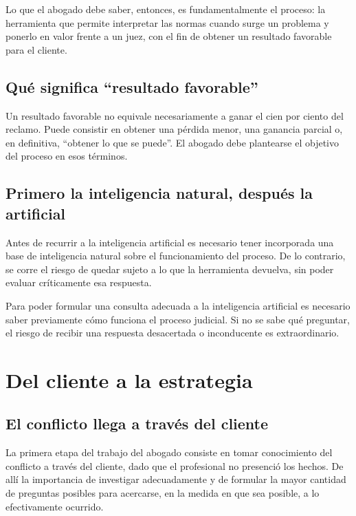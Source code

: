\documentclass[12pt,oneside]{book}
\begin{document}
Lo que el abogado debe saber, entonces, es fundamentalmente el proceso: la herramienta que permite interpretar las normas cuando surge un problema y ponerlo en valor frente a un juez, con el fin de obtener un resultado favorable para el cliente.

\subsection{Qué significa ``resultado favorable''}

\begin{important}
Un resultado favorable no equivale necesariamente a ganar el cien por ciento del reclamo. Puede consistir en obtener una pérdida menor, una ganancia parcial o, en definitiva, ``obtener lo que se puede''. El abogado debe plantearse el objetivo del proceso en esos términos.
\end{important}

\subsection{Primero la inteligencia natural, después la artificial}

Antes de recurrir a la inteligencia artificial es necesario tener incorporada una base de inteligencia natural sobre el funcionamiento del proceso. De lo contrario, se corre el riesgo de quedar sujeto a lo que la herramienta devuelva, sin poder evaluar críticamente esa respuesta.

\begin{important}
Para poder formular una consulta adecuada a la inteligencia artificial es necesario saber previamente cómo funciona el proceso judicial. Si no se sabe qué preguntar, el riesgo de recibir una respuesta desacertada o inconducente es extraordinario.
\end{important}

\section{Del cliente a la estrategia}

\subsection{El conflicto llega a través del cliente}

La primera etapa del trabajo del abogado consiste en tomar conocimiento del conflicto a través del cliente, dado que el profesional no presenció los hechos. De allí la importancia de investigar adecuadamente y de formular la mayor cantidad de preguntas posibles para acercarse, en la medida en que sea posible, a lo efectivamente ocurrido.
\end{document}
